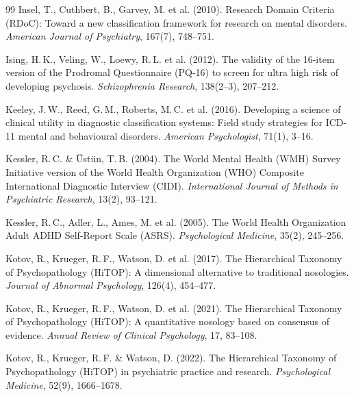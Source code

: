 \documentclass[11pt,a4paper]{article}
\begin{document}
\begin{thebibliography}{99}
Insel, T., Cuthbert, B., Garvey, M. et al. (2010).
\newblock Research Domain Criteria (RDoC): Toward a new classification framework for research on mental disorders.
\newblock \textit{American Journal of Psychiatry}, 167(7), 748--751.

Ising, H.\,K., Veling, W., Loewy, R.\,L. et al. (2012).
\newblock The validity of the 16-item version of the Prodromal Questionnaire (PQ-16) to screen for ultra high risk of developing psychosis.
\newblock \textit{Schizophrenia Research}, 138(2--3), 207--212.

Keeley, J.\,W., Reed, G.\,M., Roberts, M.\,C. et al. (2016).
\newblock Developing a science of clinical utility in diagnostic classification systems: Field study strategies for ICD-11 mental and behavioural disorders.
\newblock \textit{American Psychologist}, 71(1), 3--16.

Kessler, R.\,C. \& \"{U}st\"{u}n, T.\,B. (2004).
\newblock The World Mental Health (WMH) Survey Initiative version of the World Health Organization (WHO) Composite International Diagnostic Interview (CIDI).
\newblock \textit{International Journal of Methods in Psychiatric Research}, 13(2), 93--121.

Kessler, R.\,C., Adler, L., Ames, M. et al. (2005).
\newblock The World Health Organization Adult ADHD Self-Report Scale (ASRS).
\newblock \textit{Psychological Medicine}, 35(2), 245--256.

Kotov, R., Krueger, R.\,F., Watson, D. et al. (2017).
\newblock The Hierarchical Taxonomy of Psychopathology (HiTOP): A dimensional alternative to traditional nosologies.
\newblock \textit{Journal of Abnormal Psychology}, 126(4), 454--477.

Kotov, R., Krueger, R.\,F., Watson, D. et al. (2021).
\newblock The Hierarchical Taxonomy of Psychopathology (HiTOP): A quantitative nosology based on consensus of evidence.
\newblock \textit{Annual Review of Clinical Psychology}, 17, 83--108.

Kotov, R., Krueger, R.\,F. \& Watson, D. (2022).
\newblock The Hierarchical Taxonomy of Psychopathology (HiTOP) in psychiatric practice and research.
\newblock \textit{Psychological Medicine}, 52(9), 1666--1678.


\end{thebibliography}
\end{document}
